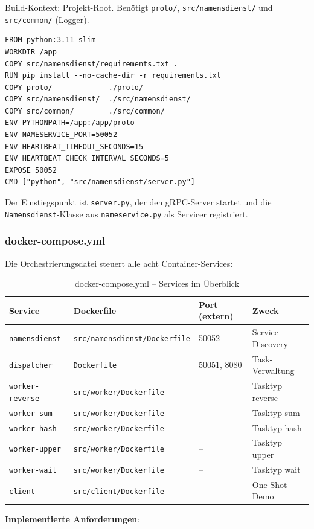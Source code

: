 Build-Kontext: Projekt-Root. Benötigt \texttt{proto/},
\texttt{src/namensdienst/} und \texttt{src/common/} (Logger).

\begin{lstlisting}[language={},caption={Namensdienst Dockerfile (src/namensdienst/Dockerfile)}]
FROM python:3.11-slim
WORKDIR /app
COPY src/namensdienst/requirements.txt .
RUN pip install --no-cache-dir -r requirements.txt
COPY proto/             ./proto/
COPY src/namensdienst/  ./src/namensdienst/
COPY src/common/        ./src/common/
ENV PYTHONPATH=/app:/app/proto
ENV NAMESERVICE_PORT=50052
ENV HEARTBEAT_TIMEOUT_SECONDS=15
ENV HEARTBEAT_CHECK_INTERVAL_SECONDS=5
EXPOSE 50052
CMD ["python", "src/namensdienst/server.py"]
\end{lstlisting}

Der Einstiegspunkt ist \texttt{server.py}, der den gRPC-Server startet und
die \texttt{Namensdienst}-Klasse aus \texttt{nameservice.py} als Servicer
registriert.

\subsubsection*{docker-compose.yml}

Die Orchestrierungsdatei steuert alle acht Container-Services:

\begin{table}[H]
\centering
\begin{tabular}{llll}
\toprule
\textbf{Service} & \textbf{Dockerfile} & \textbf{Port (extern)} & \textbf{Zweck} \\
\midrule
\texttt{namensdienst} & \texttt{src/namensdienst/Dockerfile} & 50052 & Service Discovery \\
\texttt{dispatcher}   & \texttt{Dockerfile}                  & 50051, 8080 & Task-Verwaltung \\
\texttt{worker-reverse} & \texttt{src/worker/Dockerfile}     & -- & Tasktyp reverse \\
\texttt{worker-sum}     & \texttt{src/worker/Dockerfile}     & -- & Tasktyp sum \\
\texttt{worker-hash}    & \texttt{src/worker/Dockerfile}     & -- & Tasktyp hash \\
\texttt{worker-upper}   & \texttt{src/worker/Dockerfile}     & -- & Tasktyp upper \\
\texttt{worker-wait}    & \texttt{src/worker/Dockerfile}     & -- & Tasktyp wait \\
\texttt{client}         & \texttt{src/client/Dockerfile}     & -- & One-Shot Demo \\
\bottomrule
\end{tabular}
\caption{docker-compose.yml -- Services im Überblick}
\end{table}
\newpage
\textbf{Implementierte Anforderungen}:

